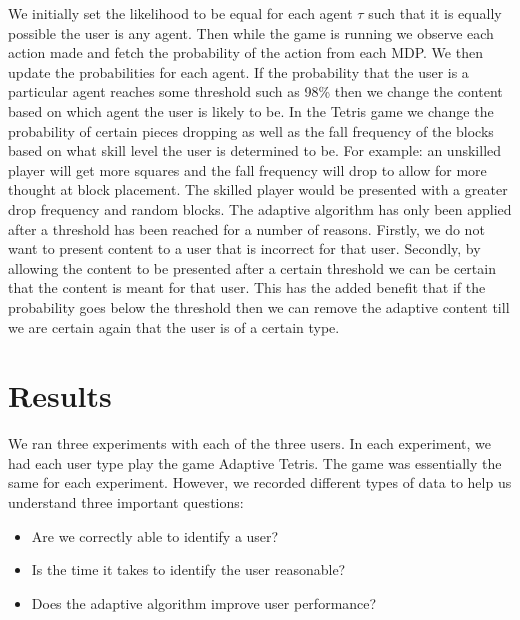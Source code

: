 \documentclass[11pt]{article}
\begin{document}
We initially set the likelihood to be equal for each agent $\tau $ such that it is equally possible the user is any agent. Then while the game is running we observe each action made and fetch the probability of the action from each MDP. We then update the probabilities for each agent. If the probability that the user is a particular agent reaches some threshold such as 98\% then we change the content based on which agent the user is likely to be. In the Tetris game we change the probability of certain pieces dropping as well as the fall frequency of the blocks based on what skill level the user is determined to be. For example: an unskilled player will get more squares and the fall frequency will drop to allow for more thought at block placement. The skilled player would be presented with a greater drop frequency and random blocks. The adaptive algorithm has only been applied after a threshold has been reached for a number of reasons. Firstly, we do not want to present content to a user that is incorrect for that user. Secondly, by allowing the content to be presented after a certain threshold we can be certain that the content is meant for that user. This has the added benefit that if the probability goes below the threshold then we can remove the adaptive content till we are certain again that the user is of a certain type.

\clearpage
\section{    Results}

We ran three experiments with each of the three users. In each experiment, we had each user type play the game Adaptive Tetris. The game was essentially the same for each experiment. However, we recorded different types of data to help us understand three important questions: 
\begin{itemize}
\item Are we correctly able to identify a user?
\item Is the time it takes to identify the user reasonable?
\item Does the adaptive algorithm improve user performance?
\end{itemize}
\end{document}
